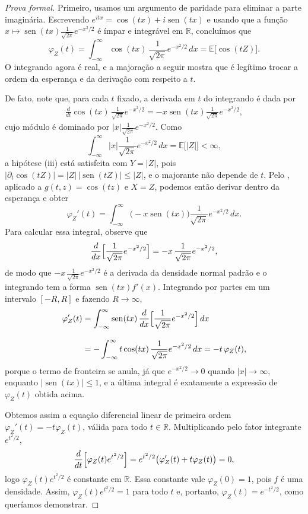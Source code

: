 \documentclass[12pt,portuguese]{article}
\theoremstyle{definition}
\theoremstyle{plainexercise}
\theoremstyle{starredexercise}
\theoremstyle{definition}
\renewcommand{\sin}{\operatorname{sen}}
\begin{document}
\begin{proof}[Prova formal]
Primeiro, usamos um argumento de paridade para eliminar a parte imaginária. Escrevendo
$e^{itx}=\cos(tx)+i\sin(tx)$ e usando que a função
$x\mapsto\sin(tx)\frac{1}{\sqrt{2\pi}}e^{-x^2/2}$ é ímpar e integrável em
$\mathbb{R}$, concluímos que
\[
\varphi_Z(t)=\int_{-\infty}^{\infty}\cos(tx)\,\frac{1}{\sqrt{2\pi}}e^{-x^2/2}\,dx
=\mathbb{E}\bigl[\cos(tZ)\bigr].
\]
O integrando agora é real, e a majoração a seguir mostra que é legítimo trocar a ordem
da esperança e da derivação com respeito a $t$.

\bigskip 

De fato, note que, para cada $t$ fixado, a derivada em $t$ do integrando é dada por
\begin{align*}
\frac{d}{dt}\cos(tx)\,\frac{1}{\sqrt{2\pi}}e^{-x^2/2}
=
-x\sin(tx)\frac{1}{\sqrt{2\pi}}e^{-x^2/2},
\end{align*}
cujo módulo é dominado por
$|x|\frac{1}{\sqrt{2\pi}}e^{-x^2/2}$. Como
\[
\int_{-\infty}^{\infty}|x|\frac{1}{\sqrt{2\pi}}e^{-x^2/2}\,dx=\mathbb{E}\bigl[|Z|\bigr]<\infty,
\]
a hipótese (iii) está satisfeita com $Y=|Z|$, pois
$\bigl|\partial_t\cos(tZ)\bigr|=|Z|\,|\sin(tZ)|\leqslant|Z|$, e o majorante
não depende de $t$. Pelo , aplicado a
$g(t,z)=\cos(tz)$ e $X=Z$, podemos então derivar dentro da esperança e
obter
\[
\varphi_Z'(t)=\int_{-\infty}^{\infty}\bigl(-x\sin(tx)\bigr)
\frac{1}{\sqrt{2\pi}}e^{-x^2/2}\,dx .
\]
Para calcular essa integral, observe que
\[
\frac{d}{dx}\Bigl[\frac{1}{\sqrt{2\pi}}e^{-x^2/2}\Bigr]
=-x\,\frac{1}{\sqrt{2\pi}}e^{-x^2/2},
\]
de modo que $-x\,\frac{1}{\sqrt{2\pi}}e^{-x^2/2}$ é a derivada da densidade normal
padrão e o integrando tem a forma $\sin(tx)f'(x)$. Integrando por partes em um
intervalo $[-R,R]$ e fazendo $R\to\infty$,
\begin{align*}
\varphi_Z'(t)
&=\int_{-\infty}^{\infty}\sin(tx)\,\frac{d}{dx}
\Bigl[\frac{1}{\sqrt{2\pi}}e^{-x^2/2}\Bigr]\,dx
\\[0.3cm]
&=-\int_{-\infty}^{\infty}t\cos(tx)\,\frac{1}{\sqrt{2\pi}}e^{-x^2/2}\,dx
=-t\,\varphi_Z(t),
\end{align*}
porque o termo de fronteira se anula, já que $e^{-x^2/2}\to 0$ quando
$|x|\to\infty$, enquanto $|\sin(tx)|\leqslant 1$, e a última integral é
exatamente a expressão de $\varphi_Z(t)$ obtida acima.

Obtemos assim a equação diferencial linear de primeira ordem
$\varphi_Z'(t)=-t\varphi_Z(t)$, válida para todo $t\in\mathbb{R}$. Multiplicando
pelo fator integrante $e^{t^2/2}$,
\[
\frac{d}{dt}\Bigl[\varphi_Z(t)e^{t^2/2}\Bigr]
=e^{t^2/2}\bigl(\varphi_Z'(t)+t\varphi_Z(t)\bigr)=0 ,
\]
logo $\varphi_Z(t)e^{t^2/2}$ é constante em $\mathbb{R}$. Essa constante vale
$\varphi_Z(0)=1$, pois $f$ é uma densidade. Assim,
$\varphi_Z(t)e^{t^2/2}=1$ para todo $t$ e, portanto,
$\varphi_Z(t)=e^{-t^2/2}$, como queríamos demonstrar.
\end{proof}
\end{document}
